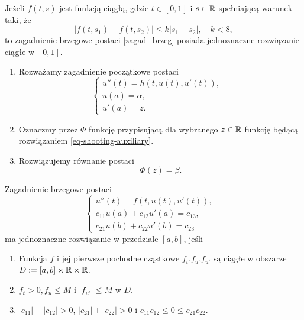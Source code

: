 \documentclass[notheorems]{beamer}
\begin{document}
\begin{frame}
\begin{theorem}
Jeżeli $f(t,s)$ jest funkcją ciągłą, gdzie $t \in [0,1]$ i $s \in \mathbb{R}$ spełniającą warunek taki, że
$$
|f(t,s_1) - f(t,s_2)| \leq k|s_1 - s_2|, \quad k<8,
$$
to zagadnienie brzegowe postaci \eqref{zagad_brzeg} posiada jednoznaczne rozwiązanie ciągłe w $[0,1]$. 
\end{theorem}
\end{frame}
\begin{frame}
\begin{algorithm}
\begin{enumerate}
\item Rozważamy zagadnienie początkowe postaci
\begin{equation} \label{eq-shooting-auxiliary}
\left\{\begin{array}{ll}
u''(t)=h(t,u(t),u'(t)), & \\
u(a)= \alpha, & \\
u'(a)= z.
\end{array}\right.
\end{equation}
\item Oznaczmy przez $\Phi$ funkcję przypisującą dla wybranego $z \in \mathbb{R}$ funkcję będącą rozwiązaniem \eqref{eq-shooting-auxiliary}.
\item Rozwiązujemy równanie postaci 
$$
\Phi(z) = \beta.
$$ 
\end{enumerate}
\end{algorithm}
\end{frame}
\begin{frame}
\begin{theorem}
Zagadnienie brzegowe postaci
\begin{equation}
\left\{\begin{array}{cl}
u''(t) = f(t,u(t),u'(t)), & \\
c_{11}u(a) + c_{12}u'(a) = c_{13}, & \\
c_{21}u(b) + c_{22}u'(b) = c_{23}
\end{array}\right.
\end{equation}
ma jednoznaczne rozwiązanie w przedziale $[a,b]$, jeśli
\begin{enumerate}
\item Funkcja $f$ i jej pierwsze pochodne cząstkowe $f_t$,$f_u$,$f_{u'}$ są ciągłe w obszarze $D:= [a,b] \times \mathbb{R} \times \mathbb{R}$.
\item $f_t >0, f_u \leq M$ i $|f_{u'}| \leq M$ w $D$.
\item $|c_{11}| + |c_{12}| > 0$, $|c_{21}| + |c_{22}| >0$ i $c_{11}c_{12}\leq 0 \leq c_{21}c_{22}$.
\end{enumerate}
\end{theorem}
\end{frame}
\end{document}
